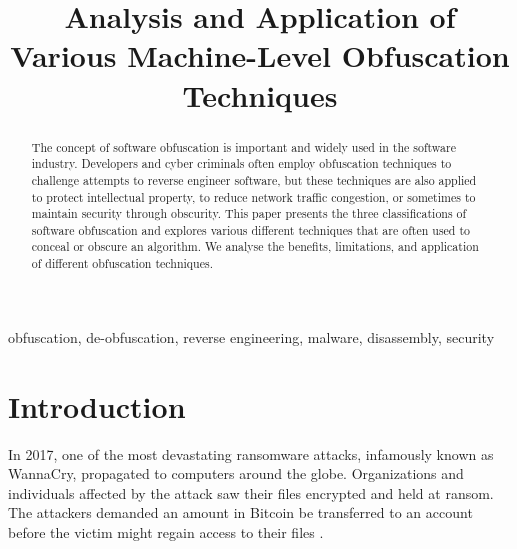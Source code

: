 \documentclass[conference]{IEEEtran}
\begin{document}
\title{Analysis and Application of Various Machine-Level Obfuscation Techniques\\}

\author{
\and
{}
}

\maketitle

\begin{abstract}
The concept of software obfuscation is important and widely used in the software industry. Developers and cyber criminals often employ obfuscation techniques to challenge attempts to reverse engineer software, but these techniques are also applied to protect intellectual property, to reduce network traffic congestion, or sometimes to maintain security through obscurity. This paper presents the three classifications of software obfuscation and explores various different techniques that are often used to conceal or obscure an algorithm. We analyse the benefits, limitations, and application of different obfuscation techniques.
\end{abstract}

\begin{IEEEkeywords}
obfuscation, de-obfuscation, reverse engineering, malware, disassembly, security
\end{IEEEkeywords}

\section{Introduction}
In 2017, one of the most devastating ransomware attacks, infamously known as WannaCry, propagated to computers around the globe. Organizations and individuals affected by the attack saw their files encrypted and held at ransom. The attackers demanded an amount in Bitcoin be transferred to an account before the victim might regain access to their files \cite{b1}.
\end{document}
